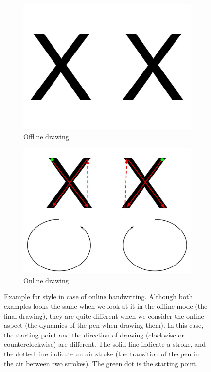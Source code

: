  \begin{figure}[!htbp]
    \centering
    \begin{subfigure}[tb]{0.45\textwidth}
        \includegraphics[width=\textwidth]{images/introduction/DIFFERENCE_IN_STYLE_PERCEPTION_1.jpg}
        \caption{Offline drawing}
    \end{subfigure}

    \begin{subfigure}[tb]{0.45\textwidth}
        \includegraphics[width=\textwidth]{images/introduction/DIFFERENCE_IN_STYLE_PERCEPTION_2.jpg}
        \caption{Online drawing}
    \end{subfigure}
    \caption{Example for style in case of online handwriting. Although both examples looks the same when we look at it in the offline mode (the final drawing), they are quite different when we consider the online aspect (the dynamics of the pen when drawing them). In this case, the starting point and the direction of drawing (clockwise or counterclockwise) are different. The solid line indicate a stroke, and the dotted line indicate an air stroke (the transition of the pen in the air between two strokes). The green dot is the starting point.}
    \label{fig:online_handwriting_styles}
  \end{figure}

